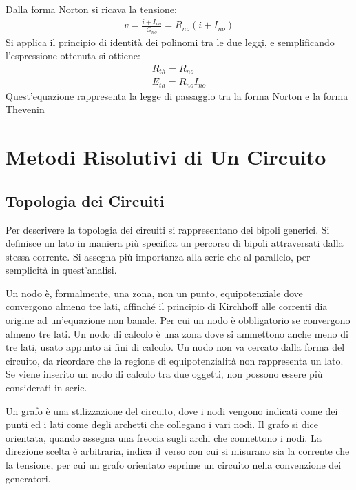 \documentclass{article}
\numberwithin{equation}{subsection}
\begin{document}
Dalla forma Norton si ricava la tensione:
\begin{gather*}
    v=\displaystyle\frac{i+I_{no}}{G_{no}}=R_{no}(i+I_{no})
\end{gather*}
Si applica il principio di identità dei polinomi tra le due leggi, e semplificando l'espressione ottenuta si ottiene:
\begin{gather*}
    R_{th}=R_{no}\\
    E_{th}=R_{no}I_{no}
\end{gather*}
Quest'equazione rappresenta la legge di passaggio tra la forma Norton e la forma Thevenin

\clearpage

\section{Metodi Risolutivi di Un Circuito}

\subsection{Topologia dei Circuiti}

Per descrivere la topologia dei circuiti si rappresentano dei bipoli generici. Si definisce un lato in maniera più specifica un percorso di bipoli attraversati dalla 
stessa corrente. Si assegna più importanza alla serie che al parallelo, per semplicità in quest'analisi. 

Un nodo è, formalmente, una zona, non un punto, equipotenziale dove convergono almeno tre lati, affinché il principio di Kirchhoff alle correnti dia origine ad un'equazione 
non banale. Per cui un nodo è obbligatorio se convergono almeno tre lati. Un nodo di calcolo è una zona dove si ammettono anche meno di tre lati, usato appunto ai fini di 
calcolo. Un nodo non va cercato dalla forma del circuito, da ricordare che la regione di equipotenzialità non rappresenta un lato. Se viene inserito un nodo di calcolo tra due 
oggetti, non possono essere più considerati in serie. 



Un grafo è una stilizzazione del circuito, dove i nodi vengono indicati come dei punti ed i lati come degli archetti che collegano i vari nodi. Il grafo si dice orientata, 
quando assegna una freccia sugli archi che connettono i nodi. La direzione scelta è arbitraria, indica il verso con cui si misurano sia la corrente che la tensione, per cui 
un grafo orientato esprime un circuito nella convenzione dei generatori.  
\end{document}
